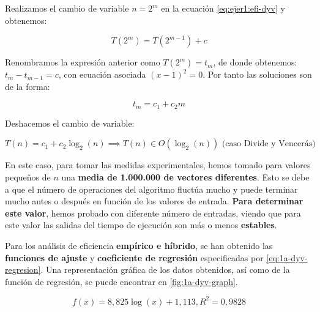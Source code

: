 Realizamos el cambio de variable $n = 2^{m}$ en la ecuación \ref{eq:ejer1:efi-dyv} y obtenemos:

\begin{equation*}
    T(2^{m}) =  T(2^{m-1}) + c 
\end{equation*}

Renombramos la expresión anterior como $T(2^{m}) = t_{m}$, de donde obtenemos: $t_{m} - t_{m-1} = c$, con
ecuación asociada $(x-1)^{2} = 0$. Por tanto las soluciones son de la forma: 

\begin{equation*}
    t_{m} = c_{1} + c_{2}m
\end{equation*}

Deshacemos el cambio de variable:

\begin{equation}
    T(n) = c_{1} + c_{2} \log_2(n) \implies \boxed{T(n) \in O(\log_2(n))}
    \text{ (caso Divide y Vencerás)}
    \label{eq:1a-eficiencia-lineal}
\end{equation}

En este caso, para tomar las medidas experimentales, hemos tomado para valores pequeños de $n$ una 
\textbf{media de 1.000.000 de vectores diferentes}. Esto se debe a que el número de operaciones del 
algoritmo fluctúa mucho y puede terminar mucho antes o después en función
de los valores de entrada. \textbf{Para determinar este valor}, hemos probado con diferente número de entradas, 
viendo que para este valor las salidas del tiempo de ejecución son más o menos \textbf{estables}. 

Para los análisis de eficiencia \textbf{empírico e híbrido}, se han obtenido las \textbf{funciones de ajuste}
y \textbf{coeficiente de regresión} especificadas por \ref{eq:1a-dyv-regresion}. Una representación
gráfica de los datos obtenidos, así como de la función de regresión, se puede encontrar en \ref{fig:1a-dyv-graph}.

\begin{equation}
    \boxed{f(x) = 8,825 \log(x) + 1,113, R^2 = 0,9828}
    \label{eq:1a-dyv-regresion}
\end{equation}

